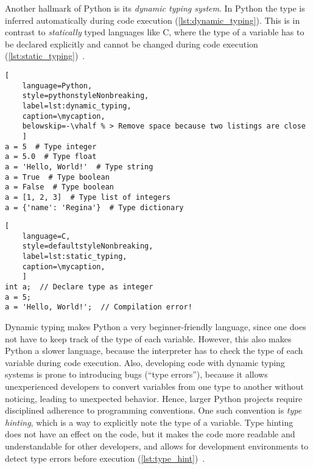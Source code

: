 Another hallmark of Python is its \textit{dynamic typing system}. In Python the
type  is inferred automatically during code execution
(\autoref{lst:dynamic_typing}). This is in contrast to \textit{statically} typed
languages like C, where the type of a variable has to be declared explicitly and
cannot be changed during code execution
(\autoref{lst:static_typing})~\cite{PythonLanguageReference}.

\def\mycaption{ Example of dynamic typing in Python. The variable ``\texttt{a}''
    is assigned the value 5, which is of type integer. The variable ``\texttt{a}''
    is then assigned the value ``\texttt{Hello, World!}'', which is of type string.
    Python allows dynamic re-assignment of variables with different types. Note that
    code after ``\texttt{\#}'' is considered a comment and won't be executed.}
\begin{lstlisting}[
    language=Python,
    style=pythonstyleNonbreaking,
    label=lst:dynamic_typing,
    caption=\mycaption,
    belowskip=-\vhalf % > Remove space because two listings are close
    ]
a = 5  # Type integer
a = 5.0  # Type float
a = 'Hello, World!'  # Type string
a = True  # Type boolean
a = False  # Type boolean
a = [1, 2, 3]  # Type list of integers
a = {'name': 'Regina'}  # Type dictionary
\end{lstlisting}

\def\mycaption{ Example of static typing in C. The variable ``\texttt{a}'' is
    declared as an integer (\texttt{int}), and can only store integers. The
    variable ``\texttt{a}'' is then assigned the value 5, which is an integer.
    The variable ``\texttt{a}'' is then assigned the value \texttt{'Hello,
        World!'}, which is a string. This results in a compilation error, because
    the variable ``\texttt{a}'' can only store integers. Note that code after
    ``\texttt{//}'' is considered a comment and won't be executed. }
\begin{lstlisting}[
    language=C,
    style=defaultstyleNonbreaking,
    label=lst:static_typing,
    caption=\mycaption,
    ]
int a;  // Declare type as integer
a = 5;
a = 'Hello, World!';  // Compilation error!
\end{lstlisting}

Dynamic typing makes Python a very beginner-friendly language, since one does
not have to keep track of the type of each variable. However, this also makes
Python a slower language, because the interpreter has to check the type of each
variable during code execution. Also, developing code with dynamic typing
systems is prone to introducing bugs (``type errors''), because it allows
unexperienced developers to convert variables from one type to another without
noticing, leading to unexpected behavior. Hence, larger Python projects require
disciplined adherence to programming conventions. One such convention is
\textit{type hinting}, which is a way to explicitly note the type of a
variable. Type hinting does not have an effect on the code, but it makes the
code more readable and understandable for other developers, and allows for
development environments to detect type errors before execution
(\autoref{lst:type_hint})~\cite{vanrossumPEP484Type2014}.


